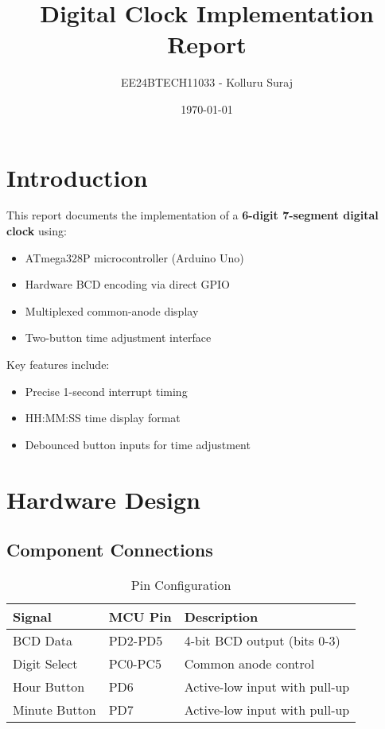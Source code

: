 \documentclass[journal]{IEEEtran}
\title{Digital Clock Implementation Report}
\author{EE24BTECH11033 - Kolluru Suraj}
\date{\today}
\begin{document}
\maketitle

\section{Introduction}
This report documents the implementation of a \textbf{6-digit 7-segment digital clock} using:
\begin{itemize}
    \item ATmega328P microcontroller (Arduino Uno)
    \item Hardware BCD encoding via direct GPIO
    \item Multiplexed common-anode display
    \item Two-button time adjustment interface
\end{itemize}

Key features include:
\begin{itemize}
    \item Precise 1-second interrupt timing
    \item HH:MM:SS time display format
    \item Debounced button inputs for time adjustment
\end{itemize}

\section{Hardware Design}

\subsection{Component Connections}
\begin{table}[h]
\centering
\caption{Pin Configuration}
\begin{tabularx}{\textwidth}{llX}
\toprule
\textbf{Signal} & \textbf{MCU Pin} & \textbf{Description} \\
\midrule
BCD Data & PD2-PD5 & 4-bit BCD output (bits 0-3) \\
Digit Select & PC0-PC5 & Common anode control \\
Hour Button & PD6 & Active-low input with pull-up \\
Minute Button & PD7 & Active-low input with pull-up \\
\bottomrule
\end{tabularx}
\end{table}
\end{document}
